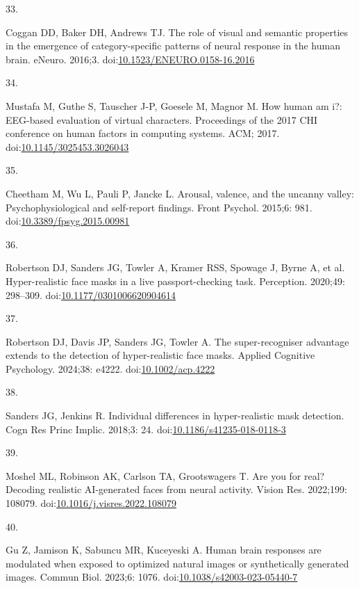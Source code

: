 \documentclass[
]{article}
\newlength{\cslhangindent}
\newlength{\csllabelwidth}
\newenvironment{CSLReferences}[2] %
 {\begin{list}{}{%
  \setlength{\itemindent}{0pt}
  \setlength{\leftmargin}{0pt}
  \setlength{\parsep}{0pt}
  \ifodd #1
   \setlength{\leftmargin}{\cslhangindent}
   \setlength{\itemindent}{-1\cslhangindent}
  \fi
  \setlength{\itemsep}{#2\baselineskip}}}
 {\end{list}}
\newcommand{\CSLLeftMargin}[1]{\parbox[t]{\csllabelwidth}{\strut#1\strut}}
\newcommand{\CSLRightInline}[1]{\parbox[t]{\linewidth - \csllabelwidth}{\strut#1\strut}}
\begin{document}
\begin{CSLReferences}{0}{1}
\CSLLeftMargin{33. }%
\CSLRightInline{Coggan DD, Baker DH, Andrews TJ. The role of visual and semantic properties in the emergence of category-specific patterns of neural response in the human brain. eNeuro. 2016;3. doi:\href{https://doi.org/10.1523/ENEURO.0158-16.2016}{10.1523/ENEURO.0158-16.2016}}

\CSLLeftMargin{34. }%
\CSLRightInline{Mustafa M, Guthe S, Tauscher J-P, Goesele M, Magnor M. How human am i?: EEG-based evaluation of virtual characters. Proceedings of the 2017 CHI conference on human factors in computing systems. ACM; 2017. doi:\href{https://doi.org/10.1145/3025453.3026043}{10.1145/3025453.3026043}}

\CSLLeftMargin{35. }%
\CSLRightInline{Cheetham M, Wu L, Pauli P, Jancke L. Arousal, valence, and the uncanny valley: Psychophysiological and self-report findings. Front Psychol. 2015;6: 981. doi:\href{https://doi.org/10.3389/fpsyg.2015.00981}{10.3389/fpsyg.2015.00981}}

\CSLLeftMargin{36. }%
\CSLRightInline{Robertson DJ, Sanders JG, Towler A, Kramer RSS, Spowage J, Byrne A, et al. Hyper-realistic face masks in a live passport-checking task. Perception. 2020;49: 298--309. doi:\href{https://doi.org/10.1177/0301006620904614}{10.1177/0301006620904614}}

\CSLLeftMargin{37. }%
\CSLRightInline{Robertson DJ, Davis JP, Sanders JG, Towler A. The super-recogniser advantage extends to the detection of hyper-realistic face masks. Applied Cognitive Psychology. 2024;38: e4222. doi:\href{https://doi.org/10.1002/acp.4222}{10.1002/acp.4222}}

\CSLLeftMargin{38. }%
\CSLRightInline{Sanders JG, Jenkins R. Individual differences in hyper-realistic mask detection. Cogn Res Princ Implic. 2018;3: 24. doi:\href{https://doi.org/10.1186/s41235-018-0118-3}{10.1186/s41235-018-0118-3}}

\CSLLeftMargin{39. }%
\CSLRightInline{Moshel ML, Robinson AK, Carlson TA, Grootswagers T. Are you for real? Decoding realistic AI-generated faces from neural activity. Vision Res. 2022;199: 108079. doi:\href{https://doi.org/10.1016/j.visres.2022.108079}{10.1016/j.visres.2022.108079}}

\CSLLeftMargin{40. }%
\CSLRightInline{Gu Z, Jamison K, Sabuncu MR, Kuceyeski A. Human brain responses are modulated when exposed to optimized natural images or synthetically generated images. Commun Biol. 2023;6: 1076. doi:\href{https://doi.org/10.1038/s42003-023-05440-7}{10.1038/s42003-023-05440-7}}

\end{CSLReferences}
\end{document}
